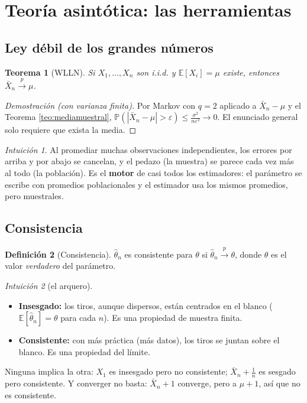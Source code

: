 \documentclass[11pt,a4paper]{article}
\theoremstyle{plain}
\newtheorem{teorema}{Teorema}[section]
\theoremstyle{definition}
\newtheorem{definicion}[teorema]{Definición}
\theoremstyle{remark}
\newtheorem*{intuicion}{Intuición}
\newcommand{\E}{\mathbb{E}}
\renewcommand{\P}{\mathbb{P}}
\newcommand{\cp}{\xrightarrow{\;p\;}}
\begin{document}
\section{Teoría asintótica: las herramientas}\label{sec:asin}

\subsection{Ley débil de los grandes números}

\begin{teorema}[WLLN]\label{teo:wlln}
Si $X_1,\dots,X_n$ son i.i.d. y $\E[X_i]=\mu$ existe, entonces $\bar X_n\cp\mu$.
\end{teorema}
\begin{proof}[Demostración (con varianza finita)]
Por Markov con $q=2$ aplicado a $\bar X_n-\mu$ y el Teorema \ref{teo:mediamuestral},
$\P(|\bar X_n-\mu|>\varepsilon)\le\frac{\sigma^2}{n\varepsilon^2}\to0$. El enunciado general
solo requiere que exista la media.
\end{proof}

\begin{intuicion}
Al promediar muchas observaciones independientes, los errores por arriba y por abajo se
cancelan, y el pedazo (la muestra) se parece cada vez más al todo (la población). Es el
\textbf{motor} de casi todos los estimadores: el parámetro se escribe con promedios
poblacionales y el estimador usa los mismos promedios, pero muestrales.
\end{intuicion}

\subsection{Consistencia}

\begin{definicion}[Consistencia]\label{def:consist}
$\hat\theta_n$ es consistente para $\theta$ si $\hat\theta_n\cp\theta$, donde $\theta$ es el
valor \emph{verdadero} del parámetro.
\end{definicion}

\begin{intuicion}[el arquero]\leavevmode
\begin{itemize}
  \item \textbf{Insesgado:} los tiros, aunque dispersos, están centrados en el blanco
        ($\E[\hat\theta_n]=\theta$ para cada $n$). Es una propiedad de muestra finita.
  \item \textbf{Consistente:} con más práctica (más datos), los tiros se juntan sobre el blanco.
        Es una propiedad del límite.
\end{itemize}
Ninguna implica la otra: $X_1$ es insesgado pero no consistente; $\bar X_n+\frac1n$ es sesgado
pero consistente. Y converger no basta: $\bar X_n+1$ converge, pero a $\mu+1$, así que no es
consistente.
\end{intuicion}
\end{document}
